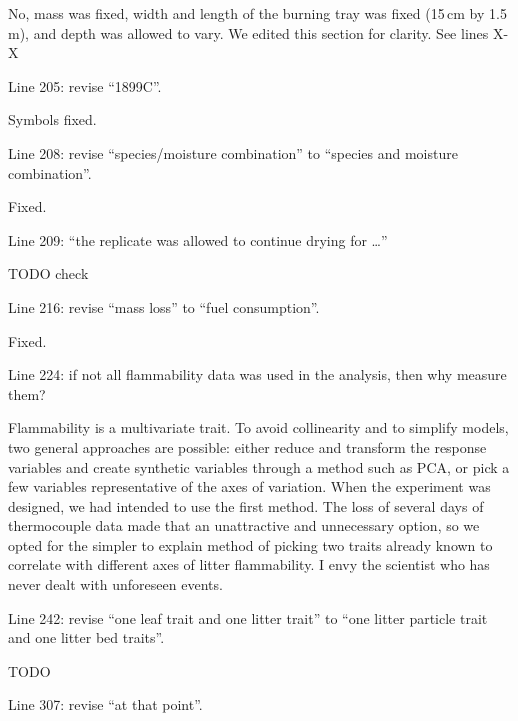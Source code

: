 \documentclass[letterpaper, 12pt]{letter}
\begin{document}
\begin{letter}{}
No, mass was fixed, width and length of the burning tray was fixed (15\,cm by
1.5\,m), and depth was allowed to vary. We edited this section for clarity. See
lines X-X

\begin{quoting}
Line 205: revise “1899C”.
\end{quoting}


Symbols fixed.

\begin{quoting}
  Line 208: revise “species/moisture combination” to “species and moisture
  combination”.
\end{quoting}

Fixed.

\begin{quoting}
  Line 209: “the replicate was allowed to continue drying for …”
\end{quoting}

TODO check

\begin{quoting}
  Line 216: revise “mass loss” to “fuel consumption”.
\end{quoting}

Fixed.

\begin{quoting}
  Line 224: if not all flammability data was used in the analysis, then why
  measure them?
\end{quoting}

Flammability is a multivariate trait. To avoid collinearity and to simplify
models, two general approaches are possible: either reduce and transform the
response variables and create synthetic variables through a method such as PCA,
or pick a few variables representative of the axes of variation. When the
experiment was designed, we had intended to use the first method. The loss of
several days of thermocouple data made that an unattractive and unnecessary
option, so we opted for the simpler to explain method of picking two traits
already known to correlate with different axes of litter flammability. I envy
the scientist who has never dealt with unforeseen events.

\begin{quoting}
  Line 242: revise “one leaf trait and one litter trait” to “one litter
  particle trait and one litter bed traits”.
\end{quoting}

TODO

\begin{quoting}
  Line 307: revise “at that point”.
\end{quoting}


\end{letter}
\end{document}
